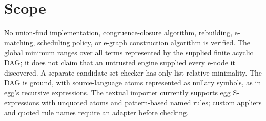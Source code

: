 \documentclass[11pt,a4paper]{article}
\begin{document}
\section{Scope}

No union-find implementation, congruence-closure algorithm, rebuilding,
e-matching, scheduling policy, or e-graph construction algorithm is verified.
The global minimum ranges over all terms represented by the supplied finite
acyclic DAG; it does not claim that an untrusted engine supplied every e-node
it discovered.  A separate candidate-set checker has only list-relative
minimality.  The DAG is ground, with source-language atoms represented as
nullary symbols, as in egg's recursive expressions.  The textual importer
currently supports egg S-expressions with unquoted atoms and pattern-based
named rules; custom appliers and quoted rule names require an adapter before
checking.



\nocite{egg}


\end{document}
